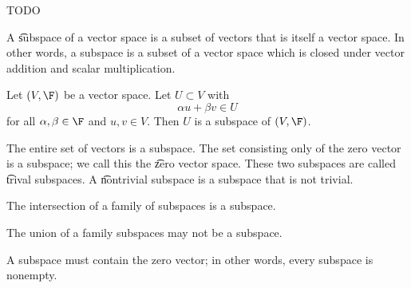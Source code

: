 
\sbasic

























\sstart
{}


TODO


A \t{subspace} of a vector space is a subset of vectors that is itself a vector space.
In other words, a subspace is a subset of a vector space which is closed under vector addition and scalar multiplication.


Let $(V, \F)$ be a vector space.
Let $U \subset V$ with
$$
  \alpha u + \beta v \in U
$$
for all $\alpha, \beta \in \F$ and $u, v \in V$.
Then $U$ is a subspace of $(V, \F)$.


The entire set of vectors is a subspace.
The set consisting only of the zero vector is a subspace; we call this the \t{zero vector space}.
These two subspaces are called \t{trival subspaces}.
A \t{nontrivial subspace} is a subspace that is not trivial.


\begin{prop}
  The intersection of a family of subspaces is a subspace.
\end{prop}

\begin{prop}
  The union of a family subspaces may not be a subspace.
\end{prop}

\begin{prop}
  A subspace must contain the zero vector; in other words, every subspace is nonempty.
\end{prop}
\strats
